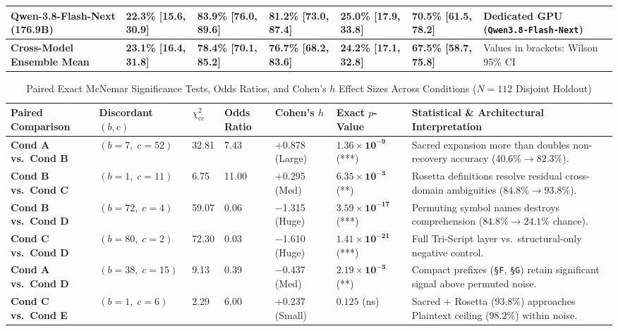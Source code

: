 \documentclass[9pt,a4paper]{extarticle}
\begin{document}
\begin{table}[h!]
\begin{tabularx}{\textwidth}{L{4.2cm} C{2.2cm} C{2.2cm} C{2.2cm} C{2.2cm} C{2.2cm} Y}
\textbf{Qwen-3.8-Flash-Next} (176.9B) & 22.3\% [15.6, 30.9] & 83.9\% [76.0, 89.6] & 81.2\% [73.0, 87.4] & 25.0\% [17.9, 33.8] & 70.5\% [61.5, 78.2] & Dedicated GPU (\texttt{Qwen3.8-Flash-Next}) \\
\midrule
{}
\textbf{Cross-Model Ensemble Mean} & \textbf{23.1\% [16.4, 31.8]} & \textbf{78.4\% [70.1, 85.2]} & \textbf{76.7\% [68.2, 83.6]} & \textbf{24.2\% [17.1, 32.8]} & \textbf{67.5\% [58.7, 75.8]} & Values in brackets: Wilson 95\% CI \\
\bottomrule
\end{tabularx}
\end{table}

\begin{table}[h!]
\centering
\caption{Paired Exact McNemar Significance Tests, Odds Ratios, and Cohen's $h$ Effect Sizes Across Conditions ($N = 112$ Disjoint Holdout)}
\label{tab:mcnemar_results}
\scriptsize
\renewcommand{\arraystretch}{0.88}
\setlength{\tabcolsep}{2.5pt}
\begin{tabularx}{\textwidth}{L{3.5cm} C{2.3cm} R{1.3cm} R{1.4cm} R{1.5cm} C{2.2cm} Y}
\toprule
{}
\textbf{\color{white}Paired Comparison} &
\textbf{\color{white}Discordant $(b, c)$} &
\textbf{\color{white}$\chi^2_{\text{cc}}$} &
\textbf{\color{white}Odds Ratio} &
\textbf{\color{white}Cohen's $h$} &
\textbf{\color{white}Exact $p$-Value} &
\textbf{\color{white}Statistical \& Architectural Interpretation} \\
\midrule
\textbf{Cond A vs.\ Cond B} & $(b=7,\; c=52)$ & 32.81 & 7.43 & $+$0.878 (Large) & $\mathbf{1.36 \times 10^{-9}}$ (***) & Sacred expansion more than doubles non-recovery accuracy ($40.6\% \rightarrow 82.3\%$). \\
\textbf{Cond B vs.\ Cond C} & $(b=1,\; c=11)$ & 6.75 & 11.00 & $+$0.295 (Med) & $\mathbf{6.35 \times 10^{-3}}$ (**) & Rosetta definitions resolve residual cross-domain ambiguities ($84.8\% \rightarrow 93.8\%$). \\
\textbf{Cond B vs.\ Cond D} & $(b=72,\; c=4)$ & 59.07 & 0.06 & $-$1.315 (Huge) & $\mathbf{3.59 \times 10^{-17}}$ (***) & Permuting symbol names destroys comprehension ($84.8\% \rightarrow 24.1\%$ chance). \\
\textbf{Cond C vs.\ Cond D} & $(b=80,\; c=2)$ & 72.30 & 0.03 & $-$1.610 (Huge) & $\mathbf{1.41 \times 10^{-21}}$ (***) & Full Tri-Script layer vs.\ structural-only negative control. \\
\textbf{Cond A vs.\ Cond D} & $(b=38,\; c=15)$ & 9.13 & 0.39 & $-$0.437 (Med) & $\mathbf{2.19 \times 10^{-3}}$ (**) & Compact prefixes (\texttt{\S F}, \texttt{\S G}) retain significant signal above permuted noise. \\
\textbf{Cond C vs.\ Cond E} & $(b=1,\; c=6)$ & 2.29 & 6.00 & $+$0.237 (Small) & $0.125$ (ns) & Sacred + Rosetta ($93.8\%$) approaches Plaintext ceiling ($98.2\%$) within noise. \\
\bottomrule
\end{tabularx}
\end{table}
\end{document}
